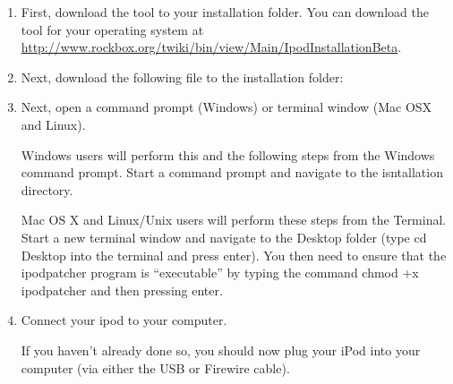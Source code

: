 \begin{enumerate} 

  \item First, download the  tool to your installation 
  folder.  You can download the  tool for your operating 
  system at 
  \url{http://www.rockbox.org/twiki/bin/view/Main/IpodInstallationBeta}.
  
  \item Next, download the following file to the installation folder: 


  \item Next, open a command prompt (Windows) or terminal window (Mac OSX and Linux).
  
    Windows users will perform this and the following steps from the Windows 
    command prompt. Start a command prompt and navigate to the isntallation 
    directory.

    Mac OS X and Linux/Unix users will perform these steps from the Terminal. 
    Start a new terminal window and navigate to the Desktop folder (type cd 
    Desktop into the terminal and press enter). You then need to ensure that the 
    ipodpatcher program is ``executable'' by typing the command chmod +x 
    ipodpatcher and then pressing enter.
  
  \item Connect your ipod to your computer.

    If you haven't already done so, you should now plug your iPod into your 
    computer (via either the USB or Firewire cable).



\end{enumerate}
